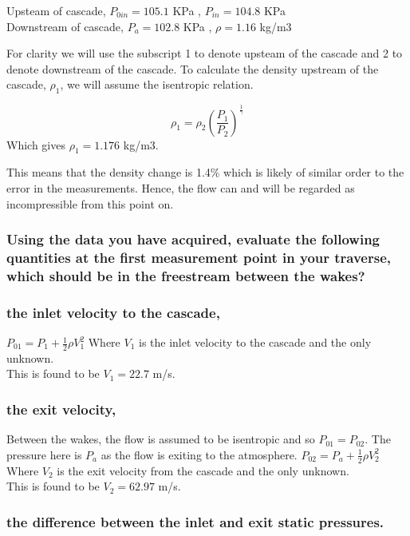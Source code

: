 \documentclass{article}
\begin{document}
Upsteam of cascade, $P_{0in} = 105.1$ KPa , $P_{in} = 104.8$ KPa \\
Downstream of cascade,  $P_a = 102.8$ KPa , $\rho = 1.16$ kg/m3

For clarity we will use the subscript 1 to denote upsteam of the cascade and 2 to denote downstream of the cascade.
To calculate the density upstream of the cascade, $\rho_1$, we will assume the isentropic relation.

\begin{equation}
    \rho_1 = \rho_2 \left( \frac{P_1}{P_2} \right)^\frac{1}{\gamma}
\end{equation}
Which gives $\rho_1 = 1.176$ kg/m3.

This means that the density change is 1.4\% which is likely of similar order to the error in the measurements.
Hence, the flow can and will be regarded as incompressible from this point on. %

\subsubsection{Using the data you have acquired, evaluate the following quantities at the first
measurement point in your traverse, which should be in the freestream between the wakes?}

\subsubsection{the inlet velocity to the cascade,}
$P_{01} = P_1 + \frac{1}{2} \rho V_{1}^2$
Where $V_1$ is the inlet velocity to the cascade and the only unknown.\\
This is found to be $V_1 = 22.7$ m/s.

\subsubsection{the exit velocity,}
Between the wakes, the flow is assumed to be isentropic and so $P_{01} = P_{02}$.
The pressure here is $P_a$ as the flow is exiting to the atmosphere.
$P_{02} = P_a + \frac{1}{2} \rho V_{2}^2$
Where $V_2$ is the exit velocity from the cascade and the only unknown.\\
This is found to be $V_2 = 62.97$ m/s.

\subsubsection{the difference between the inlet and exit static pressures.}
\end{document}

